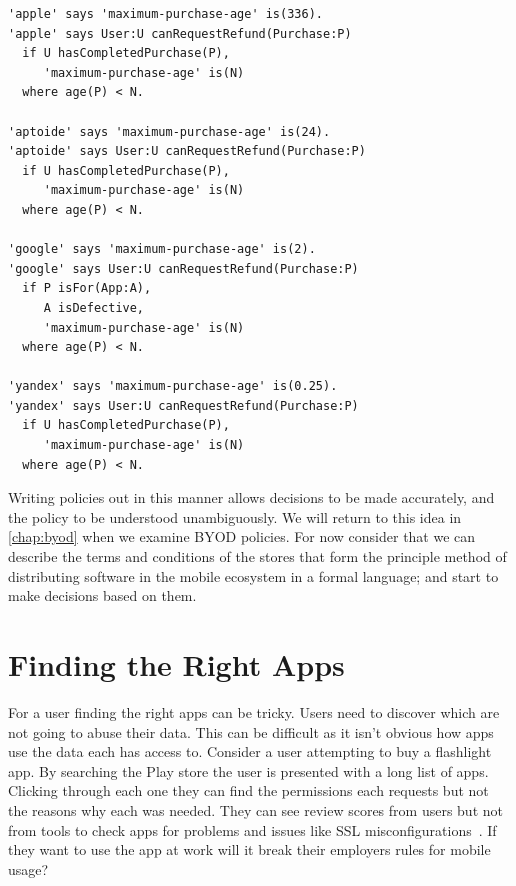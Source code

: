 \documentclass[thesis.tex]{subfiles}
\begin{document}
\begin{lstlisting}
'apple' says 'maximum-purchase-age' is(336).
'apple' says User:U canRequestRefund(Purchase:P)
  if U hasCompletedPurchase(P),
     'maximum-purchase-age' is(N)
  where age(P) < N.

'aptoide' says 'maximum-purchase-age' is(24).
'aptoide' says User:U canRequestRefund(Purchase:P)
  if U hasCompletedPurchase(P),
     'maximum-purchase-age' is(N)
  where age(P) < N.

'google' says 'maximum-purchase-age' is(2).
'google' says User:U canRequestRefund(Purchase:P)
  if P isFor(App:A),
     A isDefective,
     'maximum-purchase-age' is(N)
  where age(P) < N.

'yandex' says 'maximum-purchase-age' is(0.25).
'yandex' says User:U canRequestRefund(Purchase:P)
  if U hasCompletedPurchase(P),
     'maximum-purchase-age' is(N)
  where age(P) < N.
\end{lstlisting}

Writing policies out in this manner allows decisions to be made accurately, and the policy to be understood unambiguously.  We will return to this idea in \autoref{chap:byod} when we examine BYOD policies.
For now consider that we can describe the terms and conditions of the stores that form the principle method of distributing software in the mobile ecosystem in a formal language; and start to make decisions based on them.

\section{Finding the Right Apps}

For a user finding the right apps can be tricky.
Users need to discover which are not going to abuse their data.
This can be difficult as it isn't obvious how apps use the data each has access to.
Consider a user attempting to buy a flashlight app.
By searching the Play store the user is presented with a long list of apps.
Clicking through each one they can find the permissions each requests but not the reasons why each was needed.
They can see review scores from users but not from tools to check apps for problems and issues like SSL misconfigurations~\cite{fahl_why_2012}.
If they want to use the app at work will it break their employers rules for mobile usage?
\end{document}
